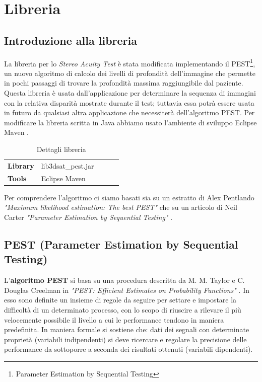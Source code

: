 \documentclass[
	corpo=12pt,
	twoside,
 	evenboxes,
	tipotesi=triennale,
    	stile=classica,
   	 greek,
]{toptesi}
\begin{document}
\chapter{Libreria}
\label{chap:libreria}

\section{Introduzione alla libreria}
\label{sec:introduzioneallalibreria}
La libreria per lo \textit{Stereo Acuity Test} è stata modificata implementando il PEST\footnote{Parameter Estimation by Sequential Testing}, un nuovo algoritmo di calcolo dei livelli di profondità dell'immagine che permette in pochi passaggi di trovare la profondità massima raggiungibile dal paziente. Questa libreria è usata dall'applicazione per determinare la sequenza di immagini con la relativa disparità mostrate durante il test; tuttavia essa potrà essere usata in futuro da qualsiasi altra applicazione che necessiterà dell'algoritmo PEST. Per modificare la libreria scritta in Java abbiamo usato l'ambiente di sviluppo Eclipse Maven \cite{eclipse}.\\

\begin{table}[]
\centering
\begin{tabular}{lllll}
\toprule
\textbf{Library} &  lib3dsat\_pest.jar\\
\textbf{Tools} & Eclipse Maven\\
\bottomrule
\end{tabular}
\caption{Dettagli libreria \label{t:1}}
\end{table}

Per comprendere l'algoritmo ci siamo basati sia su un estratto di Alex Pentlando \textit{"Maximum likelihood estimation: The best PEST"} \cite{pestalex} che su un articolo di Neil Carter \textit{"Parameter Estimation by Sequential Testing"} \cite{pestneil}.

\newpage

\section{PEST (Parameter Estimation by Sequential Testing)}
\label{sec:pest}
L'\textbf{algoritmo PEST} si basa su una procedura descritta da M. M. Taylor e C. Douglas Creelman in \textit{"PEST: Efficient Estimates on Probability Functions"} \cite{pest}. In esso sono definite un insieme di regole da seguire per settare e impostare la difficoltà di un determinato processo, con lo scopo di riuscire a rilevare il più velocemente possibile il livello a cui le performance tendono in maniera predefinita. In maniera formale si sostiene che: dati dei segnali con determinate proprietà (variabili indipendenti) si deve ricercare e regolare la precisione delle performance da sottoporre a seconda dei risultati ottenuti (variabili dipendenti).
\end{document}

